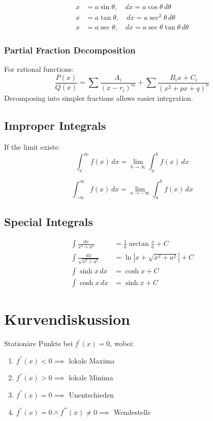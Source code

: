 \documentclass[../Main.tex]{subfiles}
\begin{document}
\begin{align}
x &= a \sin \theta, \quad dx = a \cos \theta \, d\theta \\
x &= a \tan \theta, \quad dx = a \sec^2 \theta \, d\theta \\
x &= a \sec \theta, \quad dx = a \sec \theta \tan \theta \, d\theta
\end{align}

\subsubsection{Partial Fraction Decomposition}
For rational functions:
\begin{equation}
\frac{P(x)}{Q(x)} = \sum \frac{A_i}{(x - r_i)^m} + \sum \frac{B_ix + C_i}{(x^2 + px + q)^n}
\end{equation}
Decomposing into simpler fractions allows easier integration.

\subsection{Improper Integrals}
If the limit exists:
\begin{equation}
\int_{a}^{\infty} f(x) \, dx = \lim_{b \to \infty} \int_a^b f(x) \, dx
\end{equation}

\begin{equation}
\int_{-\infty}^{\infty} f(x) \, dx = \lim_{a \to -\infty} \int_a^b f(x) \, dx
\end{equation}

\subsection{Special Integrals}

\begin{align}
\int \frac{dx}{x^2 + a^2} &= \frac{1}{a} \arctan \frac{x}{a} + C \\
\int \frac{dx}{\sqrt{x^2 + a^2}} &= \ln |x + \sqrt{x^2 + a^2}| + C \\
\int \sinh x \, dx &= \cosh x + C \\
\int \cosh x \, dx &= \sinh x + C
\end{align}


\section{Kurvendiskussion}
Stationäre Punkte bei \(f^{'}(x)=0 \), wobei:
\begin{enumerate}
    \item \( f^{''}(x)<0 \implies\) lokale Maxima
    \item \( f^{''}(x)>0 \implies\) lokale Minima
    \item \( f^{''}(x)=0 \implies\) Unentschieden
    \item \( f^{''}(x)=0 \land f^{'''}(x) \neq 0 \implies\) Wendestelle
\end{enumerate}
\end{document}
